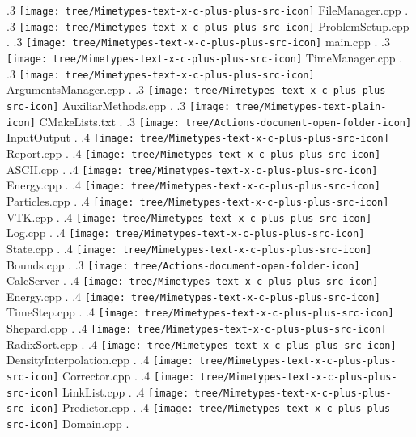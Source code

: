 {.3 { \texttt{[image: tree/Mimetypes-text-x-c-plus-plus-src-icon]} FileManager.cpp }.
.3 { \texttt{[image: tree/Mimetypes-text-x-c-plus-plus-src-icon]} ProblemSetup.cpp }.
.3 { \texttt{[image: tree/Mimetypes-text-x-c-plus-plus-src-icon]} main.cpp }.
.3 { \texttt{[image: tree/Mimetypes-text-x-c-plus-plus-src-icon]} TimeManager.cpp }.
.3 { \texttt{[image: tree/Mimetypes-text-x-c-plus-plus-src-icon]} ArgumentsManager.cpp }.
.3 { \texttt{[image: tree/Mimetypes-text-x-c-plus-plus-src-icon]} AuxiliarMethods.cpp }.
.3 { \texttt{[image: tree/Mimetypes-text-plain-icon]} CMakeLists.txt }.
.3 { \texttt{[image: tree/Actions-document-open-folder-icon]} InputOutput }.
.4 { \texttt{[image: tree/Mimetypes-text-x-c-plus-plus-src-icon]} Report.cpp }.
.4 { \texttt{[image: tree/Mimetypes-text-x-c-plus-plus-src-icon]} ASCII.cpp }.
.4 { \texttt{[image: tree/Mimetypes-text-x-c-plus-plus-src-icon]} Energy.cpp }.
.4 { \texttt{[image: tree/Mimetypes-text-x-c-plus-plus-src-icon]} Particles.cpp }.
.4 { \texttt{[image: tree/Mimetypes-text-x-c-plus-plus-src-icon]} VTK.cpp }.
.4 { \texttt{[image: tree/Mimetypes-text-x-c-plus-plus-src-icon]} Log.cpp }.
.4 { \texttt{[image: tree/Mimetypes-text-x-c-plus-plus-src-icon]} State.cpp }.
.4 { \texttt{[image: tree/Mimetypes-text-x-c-plus-plus-src-icon]} Bounds.cpp }.
.3 { \texttt{[image: tree/Actions-document-open-folder-icon]} CalcServer }.
.4 { \texttt{[image: tree/Mimetypes-text-x-c-plus-plus-src-icon]} Energy.cpp }.
.4 { \texttt{[image: tree/Mimetypes-text-x-c-plus-plus-src-icon]} TimeStep.cpp }.
.4 { \texttt{[image: tree/Mimetypes-text-x-c-plus-plus-src-icon]} Shepard.cpp }.
.4 { \texttt{[image: tree/Mimetypes-text-x-c-plus-plus-src-icon]} RadixSort.cpp }.
.4 { \texttt{[image: tree/Mimetypes-text-x-c-plus-plus-src-icon]} DensityInterpolation.cpp }.
.4 { \texttt{[image: tree/Mimetypes-text-x-c-plus-plus-src-icon]} Corrector.cpp }.
.4 { \texttt{[image: tree/Mimetypes-text-x-c-plus-plus-src-icon]} LinkList.cpp }.
.4 { \texttt{[image: tree/Mimetypes-text-x-c-plus-plus-src-icon]} Predictor.cpp }.
.4 { \texttt{[image: tree/Mimetypes-text-x-c-plus-plus-src-icon]} Domain.cpp }.
}
